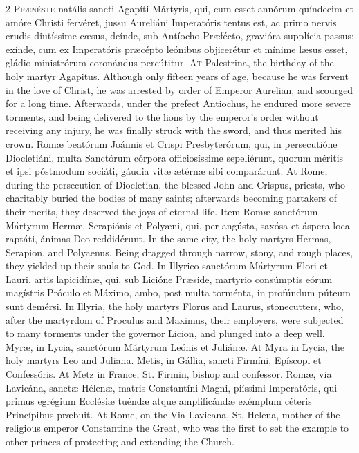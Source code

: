\begin{paracol}{2}
\lettrine[lines=2]{P}{rænéste} natális sancti 
 Agapíti Mártyris, qui, cum esset annórum quíndecim et amóre Christi fervéret, 
 jussu Aureliáni Imperatóris tentus est, ac primo nervis crudis diutíssime 
 cæsus, deínde, sub Antíocho Præfécto, gravióra supplícia passus; exínde, cum 
 ex Imperatóris præcépto leónibus objicerétur et mínime læsus esset, gládio 
 ministrórum coronándus percútitur.
\switchcolumn
{}
\lettrine[lines=2]{A}{t} Palestrina, the birthday of the 
 holy martyr Agapitus. Although only fifteen years of age, because he 
 was fervent in the love of Christ, he was arrested by order of Emperor 
 Aurelian, and scourged for a long time. Afterwards, under the prefect 
 Antiochus, he endured more severe torments, and being delivered to the lions 
 by the emperor's order without receiving any injury, he was finally struck 
 with the sword, and thus merited his crown.
\switchcolumn*
{}
Romæ beatórum Joánnis 
 et Crispi Presbyterórum, qui, in persecutióne Diocletiáni, multa Sanctórum 
 córpora officiosíssime sepeliérunt, quorum méritis et ipsi póstmodum sociáti, 
 gáudia vitæ ætérnæ sibi comparárunt.
\switchcolumn
{}
At Rome, during the persecution of 
 Diocletian, the blessed John and Crispus, priests, who charitably buried the 
 bodies of many saints; afterwards becoming partakers of their merits, they 
 deserved the joys of eternal life.
\switchcolumn*
{}
Item Romæ sanctórum 
 Mártyrum Hermæ, Serapiónis et Polyæni, qui, per angústa, saxósa et áspera 
 loca raptáti, ánimas Deo reddidérunt.
\switchcolumn
{}
In the same city, the holy martyrs 
 Hermas, Serapion, and Polyaenus. Being dragged through narrow, stony, 
 and rough places, they yielded up their souls to God.
\switchcolumn*
{}
In Illyrico sanctórum 
 Mártyrum Flori et Lauri, artis lapicidínæ, qui, sub Licióne Præside, 
 martyrio consúmptis eórum magístris Próculo et Máximo, ambo, post multa 
 torménta, in profúndum púteum sunt demérsi.
\switchcolumn
{}
In Illyria, the holy martyrs Florus 
 and Laurus, stonecutters, who, after the martyrdom of Proculus and Maximus, 
 their employers, were subjected to many torments under the governor Licion, 
 and plunged into a deep well.
\switchcolumn*
{}
Myræ, in Lycia, 
 sanctórum Mártyrum Leónis et Juliánæ.
\switchcolumn
{}
At Myra in Lycia, the holy martyrs 
 Leo and Juliana.
\switchcolumn*
{}
Metis, in Gállia, 
 sancti Firmíni, Epíscopi et Confessóris.
\switchcolumn
{}
At Metz in France, St. Firmin, 
 bishop and confessor.
\switchcolumn*
{}
Romæ, via Lavicána, 
 sanctæ Hélenæ, matris Constantíni Magni, piíssimi Imperatóris, qui primus 
 egrégium Ecclésiæ tuéndæ atque amplificándæ exémplum céteris Princípibus 
 præbuit.
\switchcolumn
{}
At Rome, on the Via Lavicana, St. 
 Helena, mother of the religious emperor Constantine the Great, who was the 
 first to set the example to other princes of protecting and extending the 
 Church.
\switchcolumn*
{}
\end{paracol}


